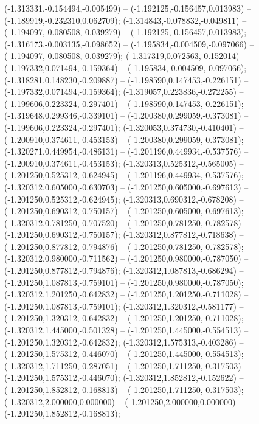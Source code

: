  (-1.313331,-0.154494,-0.005499) -- (-1.192125,-0.156457,0.013983) -- (-1.189919,-0.232310,0.062709);
 (-1.314843,-0.078832,-0.049811) -- (-1.194097,-0.080508,-0.039279) -- (-1.192125,-0.156457,0.013983);
 (-1.316173,-0.003135,-0.098652) -- (-1.195834,-0.004509,-0.097066) -- (-1.194097,-0.080508,-0.039279);
 (-1.317319,0.072563,-0.152014) -- (-1.197332,0.071494,-0.159364) -- (-1.195834,-0.004509,-0.097066);
 (-1.318281,0.148230,-0.209887) -- (-1.198590,0.147453,-0.226151) -- (-1.197332,0.071494,-0.159364);
 (-1.319057,0.223836,-0.272255) -- (-1.199606,0.223324,-0.297401) -- (-1.198590,0.147453,-0.226151);
 (-1.319648,0.299346,-0.339101) -- (-1.200380,0.299059,-0.373081) -- (-1.199606,0.223324,-0.297401);
 (-1.320053,0.374730,-0.410401) -- (-1.200910,0.374611,-0.453153) -- (-1.200380,0.299059,-0.373081);
 (-1.320271,0.449954,-0.486131) -- (-1.201196,0.449934,-0.537576) -- (-1.200910,0.374611,-0.453153);
 (-1.320313,0.525312,-0.565005) -- (-1.201250,0.525312,-0.624945) -- (-1.201196,0.449934,-0.537576);
 (-1.320312,0.605000,-0.630703) -- (-1.201250,0.605000,-0.697613) -- (-1.201250,0.525312,-0.624945);
 (-1.320313,0.690312,-0.678208) -- (-1.201250,0.690312,-0.750157) -- (-1.201250,0.605000,-0.697613);
 (-1.320312,0.781250,-0.707520) -- (-1.201250,0.781250,-0.782578) -- (-1.201250,0.690312,-0.750157);
 (-1.320312,0.877812,-0.718638) -- (-1.201250,0.877812,-0.794876) -- (-1.201250,0.781250,-0.782578);
 (-1.320312,0.980000,-0.711562) -- (-1.201250,0.980000,-0.787050) -- (-1.201250,0.877812,-0.794876);
 (-1.320312,1.087813,-0.686294) -- (-1.201250,1.087813,-0.759101) -- (-1.201250,0.980000,-0.787050);
 (-1.320312,1.201250,-0.642832) -- (-1.201250,1.201250,-0.711028) -- (-1.201250,1.087813,-0.759101);
 (-1.320312,1.320312,-0.581177) -- (-1.201250,1.320312,-0.642832) -- (-1.201250,1.201250,-0.711028);
 (-1.320312,1.445000,-0.501328) -- (-1.201250,1.445000,-0.554513) -- (-1.201250,1.320312,-0.642832);
 (-1.320312,1.575313,-0.403286) -- (-1.201250,1.575312,-0.446070) -- (-1.201250,1.445000,-0.554513);
 (-1.320312,1.711250,-0.287051) -- (-1.201250,1.711250,-0.317503) -- (-1.201250,1.575312,-0.446070);
 (-1.320312,1.852812,-0.152622) -- (-1.201250,1.852812,-0.168813) -- (-1.201250,1.711250,-0.317503);
 (-1.320312,2.000000,0.000000) -- (-1.201250,2.000000,0.000000) -- (-1.201250,1.852812,-0.168813);
